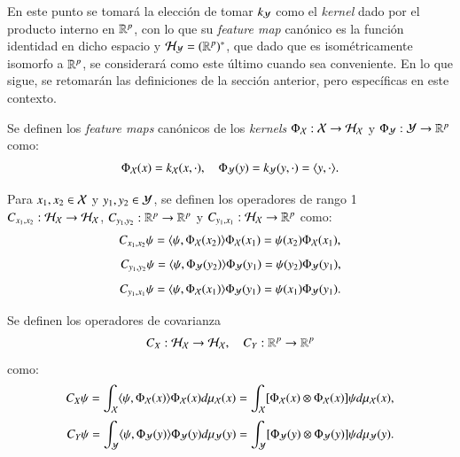 En este punto se tomará la elección de tomar $k_{\mathcal{Y}}$ como el \textit{kernel} dado por el producto interno en $\mathbb{R}^p$, con lo que su \textit{feature map} canónico es la función identidad en dicho espacio y $\mathcal{H}_{\mathcal{Y}} = (\mathbb{R}^p)^*$, que dado que es isométricamente isomorfo a $\mathbb{R}^p$, se considerará como este último cuando sea conveniente. En lo que sigue, se retomarán las definiciones de la sección anterior, pero específicas en este contexto.

\begin{defn}
	Se definen los \textit{feature maps} canónicos de los \textit{kernels} $\Phi_{\mathcal{X}} : \mathcal{X} \to \mathcal{H}_{\mathcal{X}}$ y $\Phi_{\mathcal{Y}} : \mathcal{Y} \to \mathbb{R}^p$ como:
	\begin{equation*}
		\Phi_{\mathcal{X}} (x) = k_{\mathcal{X}} (x, \cdot), \quad \Phi_{\mathcal{Y}} (y) = k_{\mathcal{Y}} (y, \cdot) = \langle y, \cdot \rangle.
	\end{equation*}
\end{defn}

\begin{defn}
	Para $x_1, x_2 \in \mathcal{X}$ y $y_1, y_2 \in \mathcal{Y}$, se definen los operadores de rango 1 $C_{x_1,x_2} : \mathcal{H}_{\mathcal{X}} \to \mathcal{H}_{\mathcal{X}}$, $C_{y_1,y_2} : \mathbb{R}^p \to \mathbb{R}^p$ y $C_{y_1,x_1} : \mathcal{H}_{\mathcal{X}} \to \mathbb{R}^p$ como:
	\begin{equation*}
		C_{x_1, x_2} \psi = \langle \psi, \Phi_{\mathcal{X}} (x_2) \rangle \Phi_{\mathcal{X}} (x_1) = \psi (x_2) \Phi_{\mathcal{X}} (x_1),
	\end{equation*}
	\begin{equation*}
		C_{y_1, y_2} \psi = \langle \psi, \Phi_{\mathcal{Y}} (y_2) \rangle \Phi_{\mathcal{Y}} (y_1) = \psi (y_2) \Phi_{\mathcal{Y}} (y_1),
	\end{equation*}
	\begin{equation*}
		C_{y_1, x_1} \psi = \langle \psi, \Phi_{\mathcal{X}} (x_1) \rangle \Phi_{\mathcal{Y}} (y_1) = \psi (x_1) \Phi_{\mathcal{Y}} (y_1).
	\end{equation*}
\end{defn}

\begin{defn}
	Se definen los operadores de covarianza 
    \begin{equation*}
        C_X : \mathcal{H}_{\mathcal{X}} \to \mathcal{H}_{\mathcal{X}}, \quad C_Y : \mathbb{R}^p \to \mathbb{R}^p
    \end{equation*} 
    como:
	\begin{equation*}
		C_X \psi = \int_{\mathcal{X}} \langle \psi, \Phi_{\mathcal{X}} (x) \rangle \Phi_{\mathcal{X}} (x) d \mu_{\mathcal{X}} (x) = \int_{\mathcal{X}} [\Phi_{\mathcal{X}} (x) \otimes \Phi_{\mathcal{X}} (x)] \psi d \mu_{\mathcal{X}} (x),
	\end{equation*}
	\begin{equation*}
		C_Y \psi = \int_{\mathcal{Y}} \langle \psi, \Phi_{\mathcal{Y}} (y) \rangle \Phi_{\mathcal{Y}} (y) d \mu_{\mathcal{Y}} (y) = \int_{\mathcal{Y}} [\Phi_{\mathcal{Y}} (y) \otimes \Phi_{\mathcal{Y}} (y)] \psi d \mu_{\mathcal{Y}} (y).
	\end{equation*}
\end{defn}

